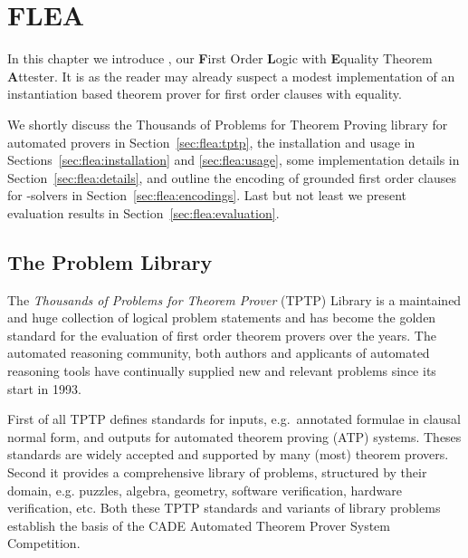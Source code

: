 
\chapter{FLEA}\label{chapter:flea}



In this chapter we introduce \FLEA{},
our
\textbf{F}irst Order \textbf{L}ogic with \textbf{E}quality Theorem \textbf{A}ttester.
It is
as the reader may already suspect
a modest implementation of an instantiation based theorem prover for first order clauses with equality. 

We shortly discuss the Thousands of Problems for Theorem Proving library for automated provers 
in Section~\vref{sec:flea:tptp},
the installation  and usage in 
Sections~\vref{sec:flea:installation} and \vref{sec:flea:usage},
some implementation details in Section~\vref{sec:flea:details}, 
and outline the encoding of grounded first order clauses for \SMT-solvers in Section~\vref{sec:flea:encodings}. 
Last but not least we present evaluation results in Section~\vref{sec:flea:evaluation}. 


\section{The Problem Library}\label{sec:flea:tptp}

The \emph{Thousands of Problems for Theorem Prover} (TPTP) Library\cite{Sut17}
is a maintained and huge collection of logical problem statements and
has become the golden standard for the evaluation of first order theorem provers over the years.
The automated reasoning community, both authors and applicants of automated reasoning tools 
have continually supplied new and relevant problems since its start in 1993.

First of all TPTP defines standards for inputs, 
e.g.~annotated formulae in clausal normal form,
and outputs for automated theorem proving (ATP) systems. 
Theses standards are widely accepted and supported by many (most) theorem provers. 
Second it provides a comprehensive library of problems, structured by their domain,
e.g. puzzles, algebra, geometry, software verification, hardware verification, etc.
Both these TPTP standards and variants of library problems establish the basis of the CADE Automated Theorem Prover System Competition\cite{Sut16}.


